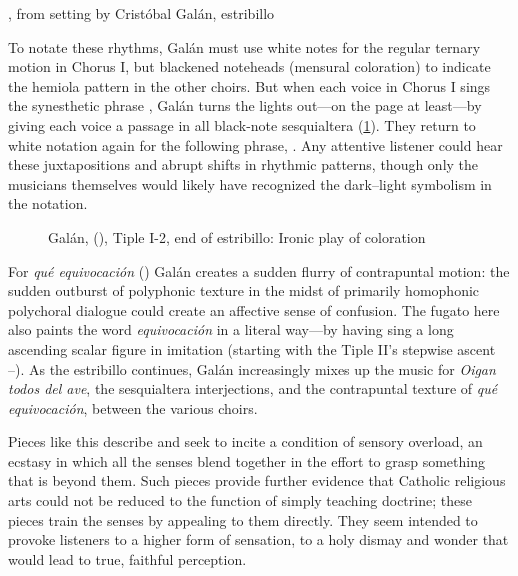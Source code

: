 \begin{poemexample}
    \caption{, from setting by Cristóbal Galán,
    estribillo}

    \label{poem:Oigan_todos_del_ave-Galan}
\end{poemexample}

To notate these rhythms, Galán must use white notes for the regular ternary
motion in Chorus I, but blackened noteheads (mensural coloration) to indicate
the hemiola pattern in the other choirs.
But when each voice in Chorus I sings the synesthetic phrase , Galán turns the lights out---on the page at least---by
giving each voice a passage in all black-note sesquialtera
(\cref{fig:Galan-Oigan-coloratio}).
They return to white notation again for the following phrase, .
Any attentive listener could hear these juxtapositions and abrupt shifts in
rhythmic patterns, though only the musicians themselves would likely have
recognized the dark--light symbolism in the notation.%
    \Autocite[36]{Kendrick:Jeremiah}

\begin{figure}
    \caption{Galán,  (),
    Tiple I-2, end of estribillo: Ironic play of coloration}

    \label{fig:Galan-Oigan-coloratio}
\end{figure}

For \emph{qué equivocación} () Galán creates a sudden
flurry of contrapuntal motion: the sudden outburst of polyphonic texture in the
midst of primarily homophonic polychoral dialogue could create an affective
sense of confusion.
The fugato here also paints the word \emph{equivocación} in a literal way---by
having  sing a long ascending scalar figure in imitation
(starting with the Tiple II's stepwise ascent --).
As the estribillo continues, Galán increasingly mixes up the music for
\emph{Oigan todos del ave}, the sesquialtera interjections, and the contrapuntal
texture of \emph{qué equivocación}, between the various choirs.

Pieces like this describe and seek to incite a condition of sensory overload, an
ecstasy in which all the senses blend together in the effort to grasp something
that is beyond them.
Such pieces provide further evidence that Catholic religious arts could not be
reduced to the function of simply teaching doctrine; these pieces train the
senses by appealing to them directly.
They seem intended to provoke listeners to a higher form of sensation, to a holy
dismay and wonder that would lead to true, faithful perception.

